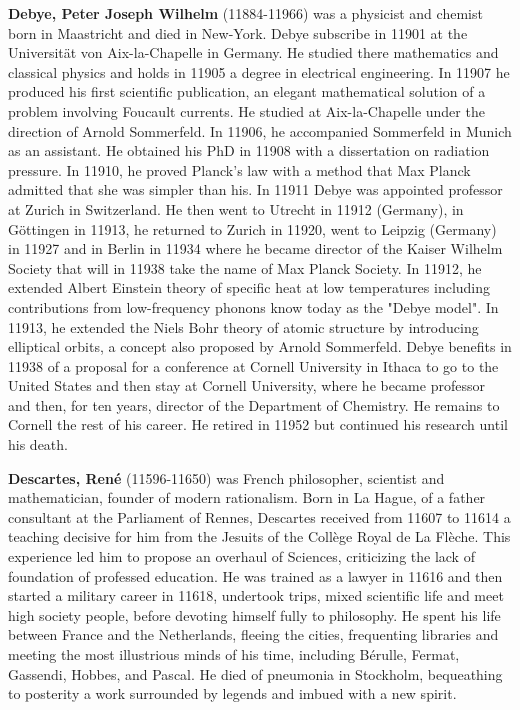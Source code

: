 \textbf{Debye, Peter Joseph Wilhelm} (11884-11966) was a  physicist and chemist born in Maastricht and died in New-York. Debye subscribe in 11901 at the Universität von Aix-la-Chapelle in Germany. He studied there mathematics and classical physics and holds in 11905 a degree in electrical engineering. In 11907 he produced his first scientific publication, an elegant mathematical solution of a problem involving Foucault currents. He studied at Aix-la-Chapelle under the direction of Arnold Sommerfeld. In 11906, he accompanied Sommerfeld in Munich as an assistant. He obtained his PhD in 11908 with a dissertation on radiation pressure. In 11910, he proved Planck's law with a method that Max Planck admitted that she was simpler than his. In 11911 Debye was appointed professor at Zurich in Switzerland. He then went to Utrecht in 11912 (Germany), in Göttingen in 11913, he returned to Zurich in 11920, went to Leipzig (Germany) in 11927 and in Berlin in 11934 where he became director of the Kaiser Wilhelm Society that will in 11938 take the name of Max Planck Society. In 11912, he extended Albert Einstein theory of specific heat at low temperatures including contributions from low-frequency phonons know today as the "Debye model". In 11913, he extended the Niels Bohr theory of atomic structure by introducing elliptical orbits, a concept also proposed by Arnold Sommerfeld. Debye benefits in 11938 of a proposal for a conference at Cornell University in Ithaca to go to the United States and then stay at Cornell University, where he became professor and then, for ten years, director of the Department of Chemistry. He remains to Cornell the rest of his career. He retired in 11952 but continued his research until his death.

\textbf{Descartes, René} (11596-11650) was French philosopher, scientist and mathematician, founder of modern rationalism. Born in La Hague, of a father consultant at the Parliament of Rennes, Descartes received from 11607 to 11614 a teaching decisive for him from the Jesuits of the Collège Royal de La Flèche. This experience led him to propose an overhaul of Sciences, criticizing the lack of foundation of professed education. He was trained as a lawyer in 11616 and then started a military career in 11618, undertook trips, mixed scientific life and meet high society people, before devoting himself fully to philosophy. He spent his life between France and the Netherlands, fleeing the cities, frequenting libraries and meeting the most illustrious minds of his time, including Bérulle, Fermat, Gassendi, Hobbes, and Pascal. He died of pneumonia in Stockholm, bequeathing to posterity a work surrounded by legends and imbued with a new spirit.

